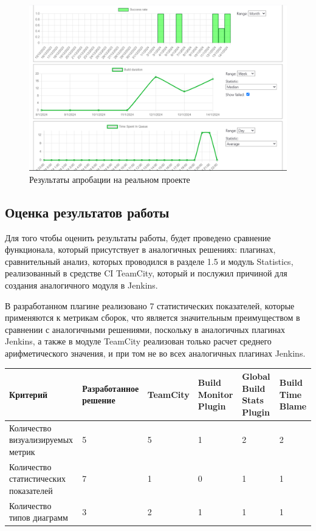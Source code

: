  \begin{figure}[ht!] 
	\center
	\includegraphics [scale=0.47] {my_folder/images//resultAprob}
	\caption{Результаты апробации на реальном проекте} 
	\label{fig:resultAprob}  
\end{figure}

 \subsection{Оценка результатов работы}
 
 Для того чтобы оценить результаты работы, будет проведено сравнение функционала, который присутствует в аналогичных решениях: плагинах, сравнительный анализ, которых проводился в разделе 1.5 и модуль Statistics, реализованный в средстве CI TeamCity, который и послужил причиной для создания аналогичного модуля в Jenkins.
 
 
 


В разработанном плагине реализовано 7 статистических показателей, которые применяются к метрикам сборок, что является значительным преимуществом в сравнении с аналогичными решениями, поскольку в аналогичных плагинах Jenkins, а также в модуле TeamCity реализован только расчет среднего арифметического значения, и при том не во всех аналогичных плагинах Jenkins.

 \begin{table}
    \centering
    \begin{tabular}{|p{3cm}|p{3cm}|p{2cm}|p{2cm}|p{2cm}|p{2cm}|}
    \hline
        Критерий & Разработанное решение & TeamCity & Build Monitor Plugin & Global Build Stats Plugin  & Build Time Blame \\ \hline
        Количество визуализируемых метрик & 5 & 5 & 1 & 2 &2 \\ \hline
        Количество статистических показателей & 7 & 1 & 0 & 1 &1\\ \hline
        Количество типов диаграмм & 3 & 2 & 1 & 1 &1\\ \hline


    \end{tabular}
\end{table}

